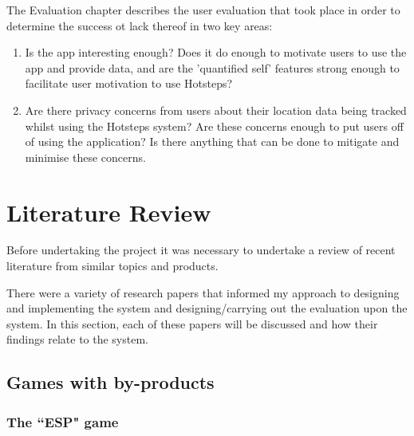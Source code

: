 \documentclass{l4proj}
\begin{document}
The Evaluation chapter describes the user evaluation that took place in order to determine the success ot lack thereof in two key areas:

\begin{enumerate}

\item{Is the app interesting enough? Does it do enough to motivate users to use the app and provide data, and are the 'quantified self' features strong enough to facilitate user motivation to use Hotsteps?}

\item{Are there privacy concerns from users about their location data being tracked whilst using the Hotsteps system? Are these concerns enough to put users off of using the application? Is there anything that can be done to mitigate and minimise these concerns.}

\end{enumerate}



\chapter{Literature Review}

Before undertaking the project it was necessary to undertake a review of recent literature from similar topics and products.

There were a variety of research papers that informed my approach to designing and implementing the system and designing/carrying out the evaluation upon the system. In this section, each of these papers will be discussed and how their findings relate to the system.

\section{Games with by-products}

\subsection{The ``ESP" game}
\end{document}
